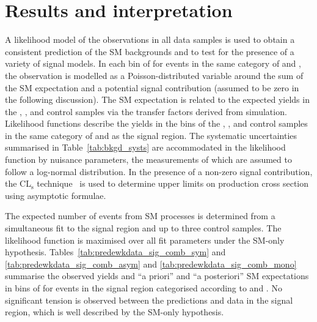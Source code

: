 \section{Results and interpretation}
\label{sec:interpretation}

A likelihood model of the observations in all data samples is used to
obtain a consistent prediction of the SM backgrounds and to test for
the presence of a variety of signal models.  In each bin of \scalht
for events in the same category of \njet and \nb, the observation is
modelled as a Poisson-distributed variable around the sum of the SM
expectation and a potential signal contribution (assumed to be zero in
the following discussion). The SM expectation is related to the
expected yields in the \mj, \mmj, and \gj control samples via the
transfer factors derived from simulation. Likelihood functions
describe the yields in the \scalht bins of the \mj, \mmj, and \gj
control samples in the same category of \njet and \nb as the signal
region. The systematic uncertainties summarised in
Table~\ref{tab:bkgd_systs} are accommodated in the likelihood function
by nuisance parameters, the measurements of which are assumed to
follow a log-normal distribution. In the presence of a non-zero signal
contribution, the CL$_{\mathrm{s}}$ technique~\cite{read,
  Cowan:2010js} is used to determine upper limits on production cross
section using asymptotic formulae.

The expected number of events from SM processes is determined from a
simultaneous fit to the signal region and up to three control
samples. The likelihood function is maximised over all fit parameters
under the SM-only hypothesis.
Tables~\ref{tab:predewkdata_sig_comb_sym} and
\ref{tab:predewkdata_sig_comb_asym} and
\ref{tab:predewkdata_sig_comb_mono} summarise the observed yields and
``a priori'' and ``a posteriori'' SM expectations in bins of \scalht
for events in the signal region categorised according to \njet and
\nb.  No significant tension is observed between the predictions and
data in the signal region, which is well described by the SM-only
hypothesis.


\clearpage

\clearpage


